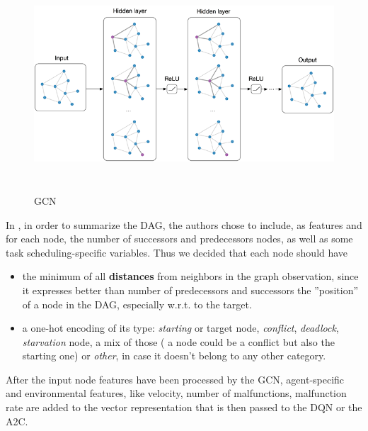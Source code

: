 \begin{figure}[H] 
\includegraphics[height=80mm, width=140mm, scale=0.5]{figures/gcn.png}
\centering
\caption{GCN}
\label{fig:s5} 
\end{figure}
\noindent
In \cite{a2c}, in order to summarize the DAG, the authors chose to include, as features and for each node, the number of successors and predecessors nodes, as well as some task scheduling-specific variables. Thus we decided that each node should have
\begin{itemize}
\item the minimum of all \textbf{distances} from neighbors in the graph observation, since it expresses better than number of predecessors and successors the ''position'' of a node in the DAG, especially w.r.t. to the target.
\item a one-hot encoding of its type: \textit{starting} or target node, \textit{conflict}, \textit{deadlock}, \textit{starvation} node, a mix of those ( a node could be a conflict but also the starting one) or \textit{other}, in case it doesn't belong to any other category.

\end{itemize}
\noindent
After the input node features have been processed by the GCN, agent-specific and environmental features, like velocity, number of malfunctions, malfunction rate are added to the vector representation that is then passed to the DQN or the A2C.
